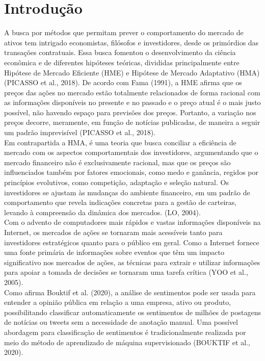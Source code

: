 \chapter{Introdução} \label{chap: Intro}

A busca por métodos que permitam prever o comportamento do mercado de ativos tem intrigado economistas, filósofos e investidores, desde os primórdios das transações contratuais. Essa busca fomentou o desenvolvimento da ciência econômica e de diferentes hipóteses teóricas, divididas principalmente entre Hipótese de Mercado Eficiente (HME) e Hipótese de Mercado Adaptativo (HMA) (PICASSO et al., 2018).
De acordo com Fama (1991), a HME afirma que os preços das ações no mercado estão totalmente relacionados de forma racional com as informações disponíveis no presente e no passado e o preço atual é o mais justo possível, não havendo espaço para previsões dos preços. Portanto, a variação nos preços decorre, meramente, em função de notícias publicadas, de maneira a seguir um padrão imprevisível (PICASSO et al., 2018). \\
Em contrapartida a HMA, é uma teoria que busca conciliar a eficiência de mercado com os aspectos comportamentais dos investidores, argumentando que o mercado financeiro não é exclusivamente racional, mas que os preços são influenciados também por fatores emocionais, como medo e ganância, regidos por princípios evolutivos, como competição, adaptação e seleção natural. Os investidores se ajustam às mudanças do ambiente financeiro, em um padrão de comportamento que revela indicações concretas para a gestão de carteiras, levando à compreensão da dinâmica dos mercados. (LO, 2004).\\
Com o advento de computadores mais rápidos e vastas informações disponíveis na Internet, os mercados de ações se tornaram mais acessíveis tanto para investidores estratégicos quanto para o público em geral. Como a Internet fornece uma fonte primária de informações sobre eventos que têm um impacto significativo nos mercados de ações, as técnicas para extrair e utilizar informações para apoiar a tomada de decisões se tornaram uma tarefa crítica (YOO et al., 2005).\\
Como afirma Bouktif et al. (2020), a análise de sentimentos pode ser usada para entender a opinião pública em relação a uma empresa, ativo ou produto, possibilitando classificar automaticamente os sentimentos de milhões de postagens de notícias ou tweets sem a necessidade de anotação manual. Uma possível abordagem para classificação de sentimentos é tradicionalmente realizada por meio do método de aprendizado de máquina supervisionado (BOUKTIF et al., 2020).\\

